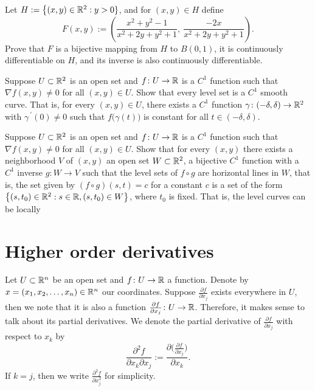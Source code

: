 \begin{exercise}
Let $H := \bigl\{ (x,y) \in {\mathbb{R}}^2 : y > 0 \}$, and for $(x,y) \in H$
define
\begin{equation*}
F(x,y) := \left(
\frac{x^2+y^2-1}{x^2+2y+y^2+1}
,~
\frac{-2x}{x^2+2y+y^2+1}
\right) .
\end{equation*}
Prove that $F$ is a bijective mapping from $H$ to $B(0,1)$, it is
continuously differentiable on $H$, and its inverse is also continuously
differentiable.
\end{exercise}

\begin{exercise}
Suppose $U \subset {\mathbb{R}}^2$ is an open set and $f \colon U \to {\mathbb{R}}$ is
a $C^1$ function such
that $\nabla f(x,y) \not= 0$ for all $(x,y) \in U$.  Show that every
level set is a $C^1$ smooth curve.  That is,
for every
$(x,y) \in U$, there exists a $C^1$ function $\gamma \colon (-\delta,\delta)
\to {\mathbb{R}}^2$ with $\gamma^{\:\prime}(0) \not= 0$ such that
$f\bigl(\gamma(t)\bigr)$ is constant for all $t \in (-\delta,\delta)$.
\end{exercise}

\begin{exercise}
Suppose $U \subset {\mathbb{R}}^2$ is an open set and $f \colon U \to {\mathbb{R}}$ is
a $C^1$ function such
that $\nabla f(x,y) \not= 0$ for all $(x,y) \in U$.
Show that for every $(x,y)$ there exists a neighborhood $V$ of $(x,y)$
an open set $W \subset {\mathbb{R}}^2$, a bijective $C^1$ function with
a $C^1$ inverse $g \colon W \to V$ such that
the level sets of $f \circ g$ are horizontal lines in $W$, that is,
the set given by $(f \circ g) (s,t) = c$ for a constant $c$ is a set of the form
$\bigl\{ (s,t_0) \in {\mathbb{R}}^2 : s \in {\mathbb{R}}, (s,t_0) \in W \bigr\}$, where $t_0$ is fixed.
That is, the level curves can be locally 
\end{exercise}


\sectionnewpage
\section{Higher order derivatives}
\label{sec:mvhighordders}


Let $U \subset {\mathbb{R}}^n$ be an open set and $f \colon U \to {\mathbb{R}}$ a function.
Denote by $x = (x_1,x_2,\ldots,x_n) \in {\mathbb{R}}^n$ our coordinates.
Suppose $\frac{\partial f}{\partial x_j}$ exists everywhere in $U$,
then we note that it is also a function $\frac{\partial f}{\partial x_j}
\colon U \to {\mathbb{R}}$.  Therefore, it makes sense to talk about its partial
derivatives.  We denote 
the partial derivative of $\frac{\partial f}{\partial x_j}$ with respect to
$x_k$ by
\begin{equation*}
\frac{\partial^2 f}{\partial x_k \partial x_j}
:=
\frac{\partial \bigl( \frac{\partial f}{\partial x_j} \bigr)}{\partial x_k} .
\end{equation*}
If $k=j$, then we write 
$\frac{\partial^2 f}{\partial x_j^2}$ for simplicity.

